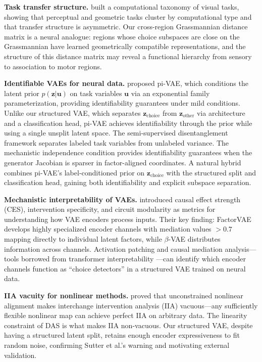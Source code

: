 \documentclass{article}
\begin{document}
\textbf{Task transfer structure.} \citet{zamir2018taskonomy} built a computational taxonomy of visual tasks, showing that perceptual and geometric tasks cluster by computational type and that transfer structure is asymmetric. Our cross-region Grassmannian distance matrix is a neural analogue: regions whose choice subspaces are close on the Grassmannian have learned geometrically compatible representations, and the structure of this distance matrix may reveal a functional hierarchy from sensory to association to motor regions.

\textbf{Identifiable VAEs for neural data.} \citet{zhou2020pivae} proposed pi-VAE, which conditions the latent prior $p(\mathbf{z}|\mathbf{u})$ on task variables $\mathbf{u}$ via an exponential family parameterization, providing identifiability guarantees under mild conditions. Unlike our structured VAE, which separates $\mathbf{z}_{\text{choice}}$ from $\mathbf{z}_{\text{other}}$ via architecture and a classification head, pi-VAE achieves identifiability through the prior while using a single unsplit latent space. The semi-supervised disentanglement framework \citep{narayanaswamy2017learning} separates labeled task variables from unlabeled variance. The mechanistic independence condition \citep{sid2026mechanistic} provides identifiability guarantees when the generator Jacobian is sparser in factor-aligned coordinates. A natural hybrid combines pi-VAE's label-conditioned prior on $\mathbf{z}_{\text{choice}}$ with the structured split and classification head, gaining both identifiability and explicit subspace separation.

\textbf{Mechanistic interpretability of VAEs.} \citet{martinez2025vae_circuits} introduced causal effect strength (CES), intervention specificity, and circuit modularity as metrics for understanding how VAE encoders process inputs. Their key finding: FactorVAE develops highly specialized encoder channels with mediation values $> 0.7$ mapping directly to individual latent factors, while $\beta$-VAE distributes information across channels. Activation patching and causal mediation analysis---tools borrowed from transformer interpretability \citep{geiger2024causal}---can identify which encoder channels function as ``choice detectors'' in a structured VAE trained on neural data.

\textbf{IIA vacuity for nonlinear methods.} \citet{sutter2025iia} proved that unconstrained nonlinear alignment makes interchange intervention analysis (IIA) vacuous---any sufficiently flexible nonlinear map can achieve perfect IIA on arbitrary data. The linearity constraint of DAS \citep{geiger2024causal} is what makes IIA non-vacuous. Our structured VAE, despite having a structured latent split, retains enough encoder expressiveness to fit random noise, confirming Sutter et al.'s warning and motivating external validation.
\end{document}
